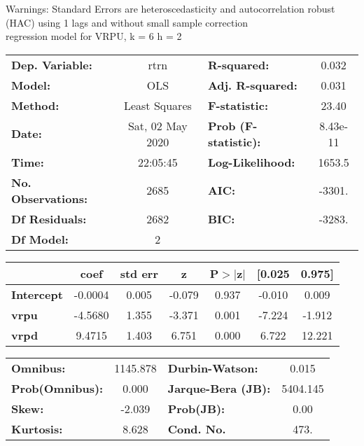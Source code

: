 Warnings: \newline
 [1] Standard Errors are heteroscedasticity and autocorrelation robust (HAC) using 1 lags and without small sample correction\\ 

regression model for VRPU, k = 6 h = 2\begin{center}
\begin{tabular}{lclc}
\toprule
\textbf{Dep. Variable:}    &       rtrn       & \textbf{  R-squared:         } &     0.032   \\
\textbf{Model:}            &       OLS        & \textbf{  Adj. R-squared:    } &     0.031   \\
\textbf{Method:}           &  Least Squares   & \textbf{  F-statistic:       } &     23.40   \\
\textbf{Date:}             & Sat, 02 May 2020 & \textbf{  Prob (F-statistic):} &  8.43e-11   \\
\textbf{Time:}             &     22:05:45     & \textbf{  Log-Likelihood:    } &    1653.5   \\
\textbf{No. Observations:} &        2685      & \textbf{  AIC:               } &    -3301.   \\
\textbf{Df Residuals:}     &        2682      & \textbf{  BIC:               } &    -3283.   \\
\textbf{Df Model:}         &           2      & \textbf{                     } &             \\
\bottomrule
\end{tabular}
\begin{tabular}{lcccccc}
                   & \textbf{coef} & \textbf{std err} & \textbf{z} & \textbf{P$> |$z$|$} & \textbf{[0.025} & \textbf{0.975]}  \\
\midrule
\textbf{Intercept} &      -0.0004  &        0.005     &    -0.079  &         0.937        &       -0.010    &        0.009     \\
\textbf{vrpu}      &      -4.5680  &        1.355     &    -3.371  &         0.001        &       -7.224    &       -1.912     \\
\textbf{vrpd}      &       9.4715  &        1.403     &     6.751  &         0.000        &        6.722    &       12.221     \\
\bottomrule
\end{tabular}
\begin{tabular}{lclc}
\textbf{Omnibus:}       & 1145.878 & \textbf{  Durbin-Watson:     } &    0.015  \\
\textbf{Prob(Omnibus):} &   0.000  & \textbf{  Jarque-Bera (JB):  } & 5404.145  \\
\textbf{Skew:}          &  -2.039  & \textbf{  Prob(JB):          } &     0.00  \\
\textbf{Kurtosis:}      &   8.628  & \textbf{  Cond. No.          } &     473.  \\
\bottomrule
\end{tabular}
\end{center}

